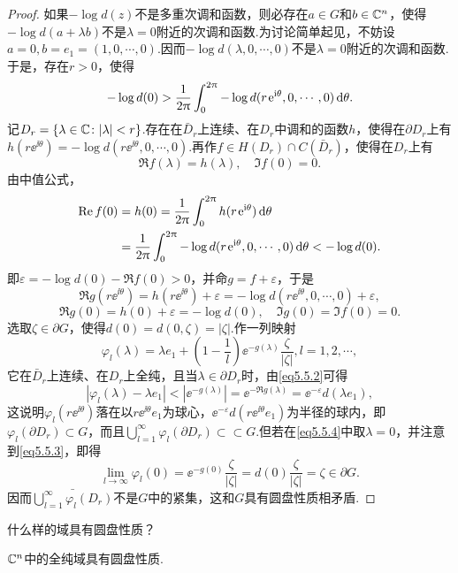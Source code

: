 \begin{proof}
	如果$-\log d(z)$不是多重次调和函数，则必存在$a\in G$和$b\in\mathbb C^n$，使得$-\log d(a+\lambda b)$不是$\lambda=0$附近的次调和函数.为讨论简单起见，不妨设$a=0,b=e_1=(1,0,\cdots,0)$.因而$-\log d(\lambda,0,\cdots,0)$不是$\lambda=0$附近的次调和函数.于是，存在$r>0$，使得
	\[-\log d(0)>\frac1{2\uppi}\int_{0}^{2\uppi}-\log d(r\operatorname{\!\!\;\mathrm e}^{\mathrm i\theta},0,\cdots,0)\mathop{}\!\mathrm{d}\theta.\]
	记$D_r=\{\lambda\in\mathbb C\colon|\lambda|<r\}$.存在在$\bar{D}_r$上连续、在$D_r$中调和的函数$h$，使得在$\partial D_r$上有$h(r\ee^{\ii\theta})=-\log d(r\ee^{\ii\theta},0,\cdots,0)$.再作$f\in H(D_r)\cap C(\bar{D}_r)$，使得在$D_r$上有
	\[\Re f(\lambda)=h(\lambda),\quad \Im f(0)=0.\]
	由中值公式，
	\begin{align*}
		\operatorname{Re} f(0)
		&=h(0)=\frac1{2\uppi}\int_{0}^{2\uppi}h(r\operatorname{\!\!\;\mathrm e}^{\mathrm i\theta})\mathop{}\!\mathrm{d}\theta\\
		&=\frac1{2\uppi}\int_{0}^{2\uppi}-\log d(r\operatorname{\!\!\;\mathrm e}^{\mathrm i\theta},0,\cdots,0)\mathop{}\!\mathrm{d}\theta<-\log d(0).
	\end{align*}
即$\varepsilon=-\log d(0)-\Re f(0)>0$，并命$g=f+\varepsilon$，于是
\begin{equation}\label{eq5.5.2}
	\Re g(r\ee^{\ii\theta})=h(r\ee^{\ii\theta})+\varepsilon=-\log d(r\ee^{\ii\theta},0,\cdots,0)+\varepsilon,
\end{equation}
\begin{equation}\label{eq5.5.3}
	\Re g(0)=h(0)+\varepsilon=-\log d(0),\quad \Im g(0)=\Im f(0)=0.
\end{equation}
选取$\zeta\in\partial G$，使得$d(0)=d(0,\zeta)=|\zeta|$.作一列映射
\begin{equation}\label{eq5.5.4}
	\varphi_l(\lambda)=\lambda e_1+\left(1-\frac1l\right)\ee^{-g(\lambda)}\frac{\zeta}{|\zeta|},l=1,2,\cdots,
\end{equation}
它在$\bar{D}_r$上连续、在$D_r$上全纯，且当$\lambda\in\partial D_r$时，由\eqref{eq5.5.2}可得
\[|\varphi_l(\lambda)-\lambda e_1|<|\ee^{-g(\lambda)}|=\ee^{-\Re g(\lambda)}=\ee^{-\varepsilon}d(\lambda e_1),\]
这说明$\varphi_l(r\ee^{\ii\theta})$落在以$r\ee^{\ii\theta}e_1$为球心，$\ee^{-\varepsilon}d(r\ee^{\ii\theta}e_1)$为半径的球内，即$\varphi_l(\partial D_r)\subset G$，而且$\bigcup_{l=1}^\infty \varphi_l(\partial D_r)\subset\subset G$.但若在\eqref{eq5.5.4}中取$\lambda=0$，并注意到\eqref{eq5.5.3}，即得
\[\lim_{l\to\infty}\varphi_l(0)=\ee^{-g(0)}\frac{\zeta}{|\zeta|}=d(0)\frac{\zeta}{|\zeta|}=\zeta\in\partial G.\]
因而$\bar{\bigcup_{l=1}^\infty \varphi_l(D_r)}$不是$G$中的紧集，这和$G$具有圆盘性质相矛盾.
\end{proof}
什么样的域具有圆盘性质？
\begin{theorem}\label{thm5.5.5}
	$\mathbb C^n$中的全纯域具有圆盘性质.
\end{theorem}
